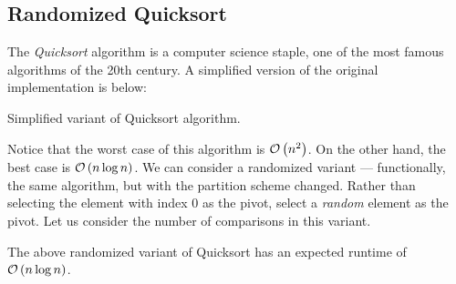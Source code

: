 \subsection{Randomized Quicksort}
The \emph{Quicksort} algorithm is a computer science staple, one of the most
famous algorithms of the 20th century. A simplified version of the original
implementation is below:

\begin{algorithm}
    \caption{Simplified variant of Quicksort algorithm.}
    \label{alg:quicksort}
\end{algorithm}

Notice that the worst case of this algorithm is $$.
On the other hand, the best case is $$.
We can consider a randomized variant --- functionally, the same algorithm, but
with the partition scheme changed. Rather than selecting the element with index
0 as the pivot, select a \emph{random} element as the pivot. Let us consider the
number of comparisons in this variant.

\begin{theorem}{}{}
    The above randomized variant of Quicksort has an expected runtime of
    $$.
\end{theorem}

